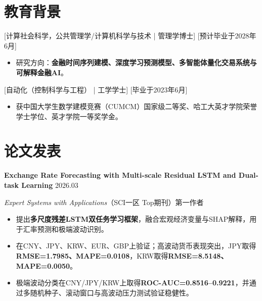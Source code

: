\documentclass{resume}
\begin{document}
\fontsize{10pt}{12.4pt}\selectfont


\ResumeTitle

\vspace{0.25cm}

\section{\textbf{教育背景}}

[\textnormal{计算社会科学，公共管理学/计算机科学与技术 |} 管理学博士]
[预计毕业于2028年6月]
\begin{itemize}
    \item 研究方向：\textbf{金融时间序列建模、深度学习预测模型、多智能体量化交易系统与可解释金融AI}。
\end{itemize}

[\textnormal{自动化（控制科学与工程） |} 工学学士]
[毕业于2023年6月]
\begin{itemize}
    \item 获中国大学生数学建模竞赛（CUMCM）国家级二等奖、哈工大英才学院荣誉学士学位、英才学院一等奖学金。
\end{itemize}


\section{\textbf{论文发表}}

{
\noindent
{\heiti \textbf{Exchange Rate Forecasting with Multi-scale Residual LSTM and Dual-task Learning}}
\hfill
2026.03

\vspace{0.15em}

\noindent
{\textit{Expert Systems with Applications}（SCI一区 Top期刊）第一作者}

\begin{itemize}
    \item 提出\textbf{多尺度残差LSTM双任务学习框架}，融合宏观经济变量与SHAP解释，用于汇率预测和极端波动识别。
    \item 在CNY、JPY、KRW、EUR、GBP上验证；高波动货币表现突出，JPY取得\textbf{RMSE=1.7985、MAPE=0.0108}，KRW取得\textbf{RMSE=8.5148、MAPE=0.0050}。
    \item 极端波动分类在CNY/JPY/KRW上取得\textbf{ROC-AUC=0.8516--0.9221}，并通过多随机种子、滚动窗口与高波动压力测试验证稳健性。
\end{itemize}
}
\end{document}
